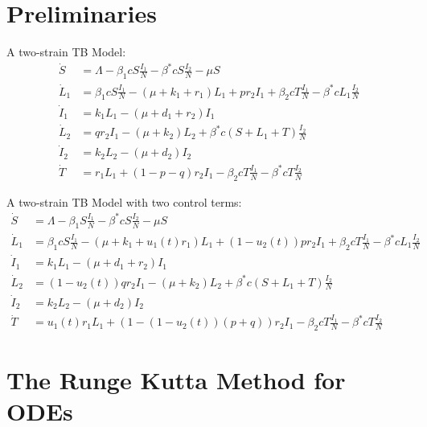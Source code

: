 \section{Preliminaries} \label{Chap1-Sect1} 

A two-strain TB Model:
\begin{align*}
	\dot{S}	&= 
    	\Lambda -\beta_{1} cS \frac{I_1}{N} - \beta^{*}cS\frac{I_2}{N} - 
        \mu S 
        \\
    \dot{L}_1 &= 
    	\beta_{1} cS \frac{I_1}{N} - (\mu + k_1 + r_1)L_{1} + pr_2 I_1 + 
        \beta_{2} cT \frac{I_1}{N} - \beta^{*}cL_{1}\frac{I_2}{N}  
        \\
    \dot{I}_1 &=  
    	k_1 L_{1} - (\mu + d_1 + r_2)I_1  
        \\
    \dot{L}_2 &=  
    	q r_2 I_1 - (\mu + k_2)L_2 + \beta^{*}c(S + L_1 + T)\frac{I_2}{N}  
        \\
    \dot{I}_2 &=  
    	k_2 L_2 - (\mu + d_2)I_2  
        \\
    \dot{T} &=  
    	r_1 L_{1} + (1-p-q)r_2 I_1 - \beta_{2} cT \frac{I_1}{N} - 
        \beta^{*}cT\frac{I_2}{N}  
\end{align*}

A two-strain TB Model with two control terms:
\begin{align*}
	\dot{S}	&= 
    	\Lambda -\beta_{1} S \frac{I_1}{N} - \beta^{*}cS\frac{I_2}{N} - 
        \mu S 
        \\
    \dot{L}_1 &= 
    	\beta_{1} cS \frac{I_1}{N} - (\mu + k_1 + u_1(t)r_1)L_{1} + 
        (1 - u_2(t))pr_2 I_1 + \beta_{2} cT \frac{I_1}{N} -
        \beta^{*}cL_{1}\frac{I_2}{N}  
        \\
    \dot{I}_1 &=  
    	k_1 L_{1} - (\mu + d_1 + r_2)I_1  
        \\
    \dot{L}_2 &=  
    	(1 - u_2(t))q r_2 I_1 - (\mu + k_2)L_2 + \beta^{*}c(S + L_1 + 
        T)\frac{I_2}{N}  
        \\
    \dot{I}_2 &=  
    	k_2 L_2 - (\mu + d_2)I_2  
        \\
    \dot{T} &=  
    	u_1(t)r_1 L_{1} + (1-(1-u_2(t))(p+q))r_2 I_1 - \beta_{2} cT \frac{I_1}{N} - 
        \beta^{*}cT\frac{I_2}{N}  
\end{align*}

\section{The Runge Kutta Method for ODEs}




